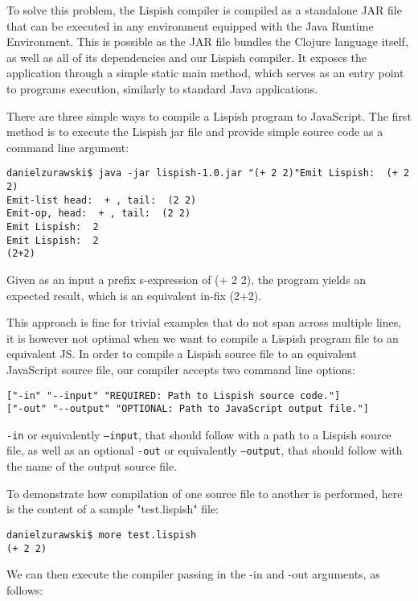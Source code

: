 To solve this problem, the Lispish compiler is compiled as a standalone JAR file that can be executed in any environment equipped with the Java Runtime Environment. This is possible as the JAR file bundles the Clojure language itself, as well as all of its dependencies and our Lispish compiler. It exposes the application through a simple static main method, which serves as an entry point to programs execution, similarly to standard Java applications. 

There are three simple ways to compile a Lispish program to JavaScript. The first method is to execute the Lispish jar file and provide simple source code as a command line argument:

\begin{verbatim}
danielzurawski$ java -jar lispish-1.0.jar "(+ 2 2)"Emit Lispish:  (+ 2 2)
Emit-list head:  + , tail:  (2 2)
Emit-op, head:  + , tail:  (2 2)
Emit Lispish:  2
Emit Lispish:  2
(2+2)
\end{verbatim}

Given as an input a prefix s-expression of (+ 2 2), the program yields an expected result, which is an equivalent in-fix (2+2).

This approach is fine for trivial examples that do not span across multiple lines, it is however not optimal when we want to compile a Lispish program file to an equivalent JS. 
In order to compile a Lispish source file to an equivalent JavaScript source file, our compiler accepts two command line options:

\begin{verbatim}
["-in" "--input" "REQUIRED: Path to Lispish source code."]
["-out" "--output" "OPTIONAL: Path to JavaScript output file."]
\end{verbatim}

\texttt{-in} or equivalently  \texttt{--input}, that should follow with a path to a Lispish source file, as well as an optional 
\texttt{-out} or equivalently \texttt{--output}, that should follow with the name of the output source file. 

To demonstrate how compilation of one source file to another is performed, here is the content of a sample "test.lispish" file:

\begin{verbatim}
danielzurawski$ more test.lispish
(+ 2 2)
\end{verbatim}

We can then execute the compiler passing in the -in and -out arguments, as follows:

